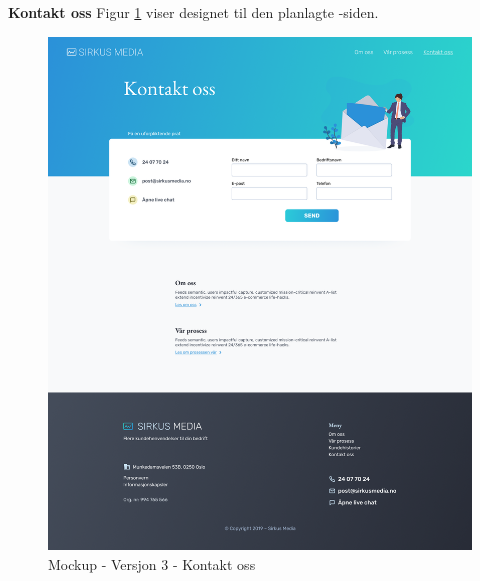 \textbf{Kontakt oss}
Figur \ref{fig:mockup-v3-contact} viser designet til den planlagte -siden.
\begin{figure}[H]
    \centering
    \includegraphics[width=\textwidth]{mockup3-contact.png}
    \caption{Mockup - Versjon 3 - Kontakt oss}
    \label{fig:mockup-v3-contact}
\end{figure}





